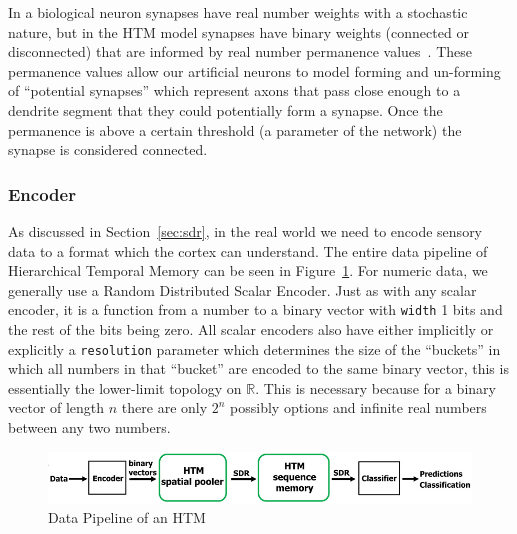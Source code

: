\documentclass[oneside,12pt,openany]{book}
\begin{document}
	In a biological neuron synapses have real number weights with a stochastic nature, but in the HTM model synapses have binary weights (connected or disconnected) that are informed by real number permanence values~\cite{Whitepaper}. These permanence values allow our artificial neurons to model forming and un-forming of ``potential synapses'' which represent axons that pass close enough to a dendrite segment that they could potentially form a synapse. Once the permanence is above a certain threshold (a parameter of the network) the synapse is considered connected.
	
	\subsubsection{Encoder}
	
	As discussed in Section~\ref{sec:sdr}, in the real world we need to encode sensory data to a format which the cortex can understand. The entire data pipeline of Hierarchical Temporal Memory can be seen in Figure~\ref{fig:HTMpipeline}. For numeric data, we generally use a Random Distributed Scalar Encoder. Just as with any scalar encoder, it is a function from a number to a binary vector with \texttt{width} 1 bits and the rest of the bits being zero. All scalar encoders also have either implicitly or explicitly a \texttt{resolution} parameter which determines the size of the ``buckets'' in which all numbers in that ``bucket'' are encoded to the same binary vector, this is essentially the lower-limit topology on $\mathbb{R}$. This is necessary because for a binary vector of length $n$ there are only $2^{n}$ possibly options and infinite real numbers between any two numbers.
	
	\begin{figure}[!ht]
		\centering
		\includegraphics[width=\linewidth]{images/DataPipeline.jpg}
		\caption[Data Pipeline of an HTM]{Data Pipeline of an HTM~\cite{TheHTMSpatialPooler}}
		\label{fig:HTMpipeline}
	\end{figure}
\end{document}
